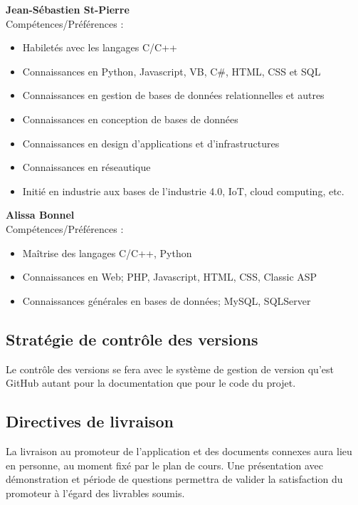 \documentclass[12pt]{article}
\begin{document}
\noindent \textbf{Jean-Sébastien St-Pierre} \\
Compétences/Préférences :
\begin{itemize}
    \item Habiletés avec les langages C/C++
    \item Connaissances en Python, Javascript, VB, C\#, HTML, CSS et SQL
    \item Connaissances en  gestion de bases de données relationnelles et autres
    \item Connaissances en conception de bases de données
    \item Connaissances en design d'applications et d'infrastructures
    \item Connaissances en réseautique
    \item Initié en industrie aux bases de l’industrie 4.0, IoT, cloud
    computing, etc. \\
\end{itemize}

\noindent \textbf{Alissa Bonnel} \\
Compétences/Préférences :
\begin{itemize}
    \item Maîtrise des langages C/C++, Python
    \item Connaissances en Web; PHP, Javascript, HTML, CSS, Classic ASP
    \item Connaissances générales en bases de données; MySQL, SQLServer \\
\end{itemize}

\subsection{Stratégie de contrôle des versions}

Le contrôle des versions se fera avec le système de gestion de version qu'est GitHub autant
pour la documentation que pour le code du projet.

\subsection{Directives de livraison}
La livraison au promoteur de l'application et des documents connexes aura lieu en personne, au moment fixé par le plan de cours.  Une présentation avec démonstration et période de questions permettra de valider la satisfaction du promoteur à l'égard des livrables soumis.

\newpage
\end{document}
